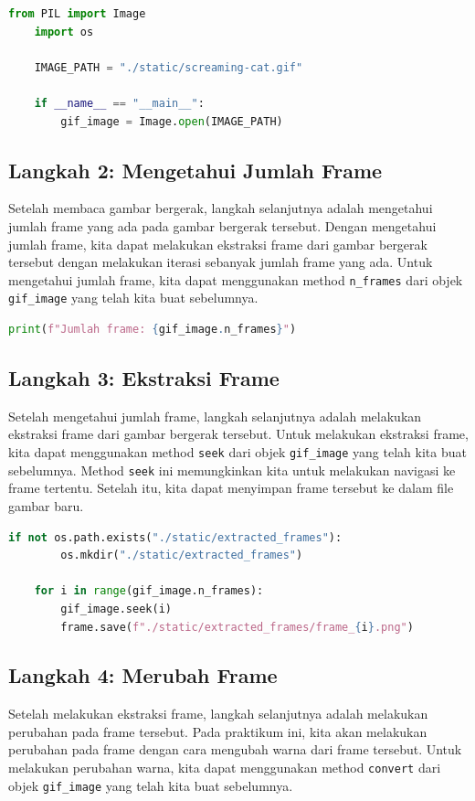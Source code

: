 \documentclass{assignment}
\newcommand\tab[1][0.5cm]{\hspace*{#1}}
\begin{document}
\begin{lstlisting}[language=Python ,style=code]
    from PIL import Image
    import os

    IMAGE_PATH = "./static/screaming-cat.gif"

    if __name__ == "__main__":
        gif_image = Image.open(IMAGE_PATH)
\end{lstlisting}

\subsection*{Langkah 2: Mengetahui Jumlah Frame}
\tab Setelah membaca gambar bergerak, langkah selanjutnya adalah mengetahui jumlah frame yang ada pada gambar bergerak tersebut. Dengan mengetahui jumlah frame, kita dapat melakukan ekstraksi frame dari gambar bergerak tersebut dengan melakukan iterasi sebanyak jumlah frame yang ada. Untuk mengetahui jumlah frame, kita dapat menggunakan method \texttt{n\_frames} dari objek \texttt{gif\_image} yang telah kita buat sebelumnya.

\begin{lstlisting}[language=Python ,style=code]
    print(f"Jumlah frame: {gif_image.n_frames}")
\end{lstlisting}

\subsection*{Langkah 3: Ekstraksi Frame}
\tab Setelah mengetahui jumlah frame, langkah selanjutnya adalah melakukan ekstraksi frame dari gambar bergerak tersebut. Untuk melakukan ekstraksi frame, kita dapat menggunakan method \texttt{seek} dari objek \texttt{gif\_image} yang telah kita buat sebelumnya. Method \texttt{seek} ini memungkinkan kita untuk melakukan navigasi ke frame tertentu. Setelah itu, kita dapat menyimpan frame tersebut ke dalam file gambar baru.

\begin{lstlisting}[language=Python ,style=code]
    if not os.path.exists("./static/extracted_frames"):
        os.mkdir("./static/extracted_frames")

    for i in range(gif_image.n_frames):
        gif_image.seek(i)
        frame.save(f"./static/extracted_frames/frame_{i}.png")
\end{lstlisting}

\subsection*{Langkah 4: Merubah Frame}
\tab Setelah melakukan ekstraksi frame, langkah selanjutnya adalah melakukan perubahan pada frame tersebut. Pada praktikum ini, kita akan melakukan perubahan pada frame dengan cara mengubah warna dari frame tersebut. Untuk melakukan perubahan warna, kita dapat menggunakan method \texttt{convert} dari objek \texttt{gif\_image} yang telah kita buat sebelumnya.
\end{document}
